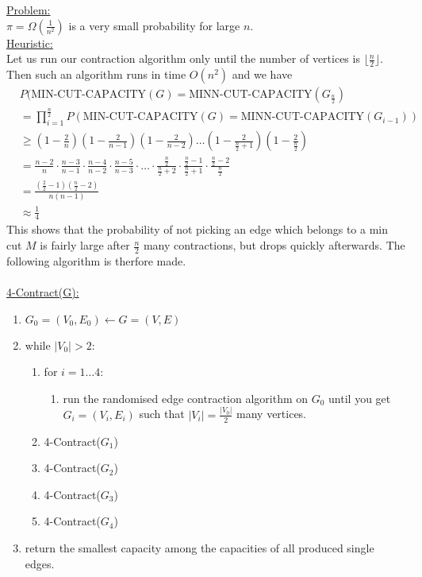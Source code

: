 \documentclass[12pt, letterpaper]{article}
\begin{document}
\underline{Problem:}\\
$\pi = \Omega(\frac{1}{n^2})$ is a very small probability for large $n$.\\
\underline{Heuristic:}\\
Let us run our contraction algorithm only until the number of vertices is $\lfloor \frac{n}{2} \rfloor$.\\
Then such an algorithm runs in time $O(n^2)$ and we have \begin{align*}
    &P(\text{MIN-CUT-CAPACITY}(G) = \text{MINN-CUT-CAPACITY}(G_{\frac{n}{2}})\\
    &= \prod_{i = 1}^{\frac{n}{2}}P(\text{MIN-CUT-CAPACITY}(G) = \text{MINN-CUT-CAPACITY}(G_{i - 1}))\\
    &\geq (1 - \frac{2}{n})(1- \frac{2}{n - 1})(1 - \frac{2}{n - 2})\dots (1 - \frac{2}{\frac{n}{2} + 1})(1 - \frac{2}{\frac{n}{2}})\\
    &=\frac{n - 2}{n}\cdot\frac{n - 3}{n - 1}\cdot \frac{n - 4}{n - 2}\cdot \frac{n - 5}{n - 3}\cdot \dots \cdot \frac{\frac{n}{2}}{\frac{n}{2} + 2} \cdot \frac{\frac{n}{2} - 1}{\frac{n}{2} + 1}\cdot \frac{\frac{n}{2} - 2}{\frac{n}{2}}\\
    &=\frac{(\frac{2}{2} - 1)(\frac{n}{2} - 2)}{n(n - 1)}\\
    &\approx \frac{1}{4}
\end{align*}
This shows that the probability of not picking an edge which belongs to a min cut $M$ is fairly large after $\frac{n}{2}$ many contractions, but drops quickly afterwards. The following algorithm is therfore made.\\\\
\underline{4-Contract(G):}
\begin{enumerate}
    \item $G_0 = (V_0, E_0) \leftarrow G = (V, E)$
    \item while $|V_0| > 2$: \begin{enumerate}
        \item for $i = 1 \dots 4$: \begin{enumerate}
            \item run the randomised edge contraction algorithm on $G_0$ until you get $G_i = (V_i, E_i)$ such that $|V_i| = \frac{|V_0|}{2}$ many vertices.
        \end{enumerate}
        \item 4-Contract($G_1$)
        \item 4-Contract($G_2$)
        \item 4-Contract($G_3$)
        \item 4-Contract($G_4$)
    \end{enumerate}
    \item return the smallest capacity among the capacities of all produced single edges.
\end{enumerate}
\end{document}
